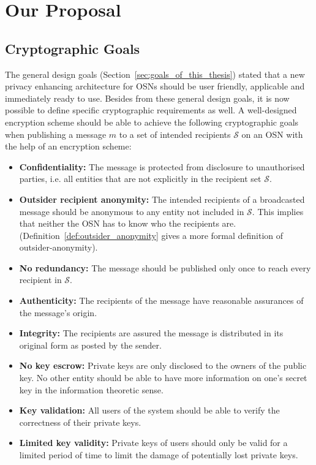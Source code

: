 \section{Our Proposal}
\label{sec:our_proposal}

\subsection{Cryptographic Goals}
\label{sec:cryptographic_goals}
The general design goals (Section~\ref{sec:goals_of_this_thesis}) stated that a new privacy enhancing architecture for OSNs should be user friendly, applicable and immediately ready to use. Besides from these general design goals, it is now possible to define specific cryptographic requirements as well. A well-designed encryption scheme should be able to achieve the following cryptographic goals when publishing a message $m$ to a set of intended recipients $\mathcal{S}$ on an OSN with the help of an encryption scheme:
\begin{itemize}
 \item \textbf{Confidentiality:} The message is protected from disclosure to unauthorised parties, i.e. all entities that are not explicitly in the recipient set $\mathcal{S}$.
 \item \textbf{Outsider recipient anonymity:} The intended recipients of a broadcasted message should be anonymous to any entity not included in $\mathcal{S}$. This implies that neither the OSN has to know who the recipients are. (Definition~\ref{def:outsider_anonymity} gives a more formal definition of outsider-anonymity).
 \item \textbf{No redundancy:} The message should be published only once to reach every recipient in $\mathcal{S}$.
 \item \textbf{Authenticity:} The recipients of the message have reasonable assurances of the message's origin.
 \item \textbf{Integrity:} The recipients are assured the message is distributed in its original form as posted by the sender.
 \item \textbf{No key escrow:} Private keys are only disclosed to the owners of the public key. No other entity should be able to have more information on one's secret key in the information theoretic sense.
 \item \textbf{Key validation:} All users of the system should be able to verify the correctness of their private keys.
 \item \textbf{Limited key validity:} Private keys of users should only be valid for a limited period of time to limit the damage of potentially lost private keys.
\end{itemize}

